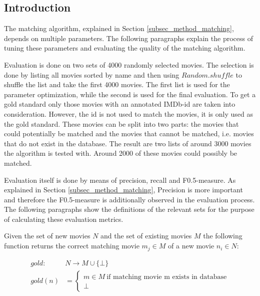 \label{subsec_evaluation_matching}

\subsection{Introduction}
The matching algorithm, explained in Section \ref{subsec_method_matching}, depends on multiple parameters.
The following paragraphs explain the process of tuning these parameters and evaluating the quality of the matching algorithm.

Evaluation is done on two sets of 4000 randomly selected movies.
The selection is done by listing all movies sorted by name and then using $Random.shuffle$ to shuffle the list and take the first 4000 movies.
The first list is used for the parameter optimization, while the second is used for the final evaluation.
To get a gold standard only those movies with an annotated IMDb-id are taken into consideration.
However, the id is not used to match the movies, it is only used as the gold standard.
These movies can be split into two parts: the movies that could potentially be matched and the movies that cannot be matched, i.e. movies that do not exist in the database.
The result are two lists of around 3000 movies the algorithm is tested with.
Around 2000 of these movies could possibly be matched.

Evaluation itself is done by means of precision, recall and F0.5-measure.
As explained in Section \ref{subsec_method_matching}, Precision is more important and therefore the F0.5-measure is additionally observed in the evaluation process.
The following paragraphs show the definitions of the relevant sets for the purpose of calculating these evaluation metrics.

Given the set of new movies $N$ and the set of existing movies $M$ the following function returns the correct matching movie $m_{j} \in M$ of a new movie $n_{i} \in N$:

\begin{align}
	gold: ~&N \rightarrow M \cup \{\bot\} \\
	gold(n) &=
		\begin{cases}
		m \in M ~\text{if matching movie m exists in database}  \\
		\bot
		\end{cases}
\end{align}

